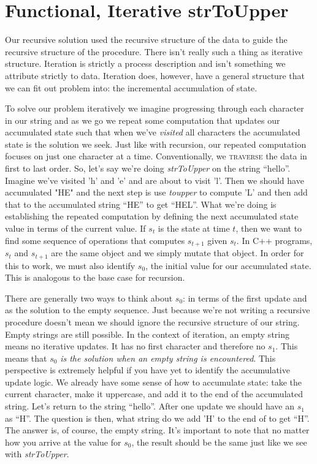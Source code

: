 \documentclass[]{tufte-handout}
\begin{document}
\section{Functional, Iterative strToUpper}

Our recursive solution used the recursive structure of the data to guide the recursive structure of the procedure. There isn't really such a thing as iterative structure. Iteration is strictly a process description and isn't something we attribute strictly to data. Iteration does, however, have a general structure that we can fit out problem into: the incremental accumulation of state.   

To solve our problem iteratively we imagine progressing through each character in our string and as we go we repeat some computation that updates our accumulated state such that when we've \textit{visited} all characters the accumulated state is the solution we seek.  Just like with recursion, our repeated computation focuses on just one character at a time. Conventionally, we \textsc{traverse} the data in first to last order.  So, let's say we're doing \textit{strToUpper} on the string ``hello''.  Imagine we've visited 'h' and 'e' and are about to visit 'l'. Then we should have accumulated "HE" and the next step is use \textit{toupper} to compute 'L' and then add that to the accumulated string ``HE'' to get ``HEL''.  What we're doing is establishing the repeated computation by defining the next accumulated state value in terms of the current value.  If $s_t$ is the state at time $t$, then we want to find some sequence of operations that computes $s_{t+1}$ given $s_t$. In C++ programs, $s_t$ and $s_{t+1}$ are the same object and we simply mutate that object.  In order for this to work, we must also identify $s_0$, the initial value for our accumulated state. This is analogous to the base case for recursion.  

There are generally two ways to think about $s_0$: in terms of the first update and as the solution to the empty sequence. Just because we're not writing a recursive procedure doesn't mean we should ignore the recursive structure of our string.  Empty strings are still possible. In the context of iteration, an empty string means no iterative updates.  It has no first character and therefore no $s_{1}$.  This means that $s_0$ \textit{is the solution when an empty string is encountered}. This perspective is extremely helpful if you have yet to identify the accumulative update logic. We already have some sense of how to accumulate state: take the current character, make it uppercase, and add it to the end of the accumulated string.  Let's return to the string ``hello''.  After one update we should have an $s_1$ as ``H''.  The question is then, what string do we add 'H' to the end of to get ``H''.  The answer is, of course, the empty string.  It's important to note that no matter how you arrive at the value for $s_0$, the result should be the same just like we see with \textit{strToUpper}.
\end{document}
